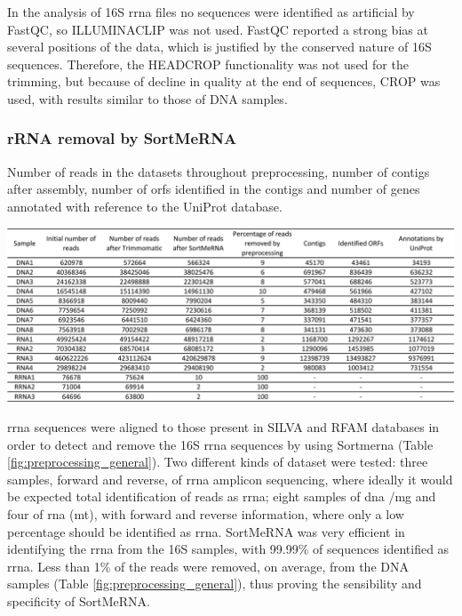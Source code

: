 \documentclass[
  oneside,
  11pt, a4paper,
  footinclude=true,
  headinclude=true,
  cleardoublepage=empty
]{scrbook}
\begin{document}
    In the analysis of 16S \gls{rrna} files no sequences were identified as artificial by FastQC, so ILLUMINACLIP was not used. FastQC reported a strong bias at several positions of the data, which is justified by the conserved nature of 16S sequences. Therefore, the HEADCROP functionality was not used for the trimming, but because of decline in quality at the end of sequences, CROP was used, with results similar to those of DNA samples.
    
    \subsubsection{rRNA removal by SortMeRNA}
    
    \begin{table}[ph!]    
    \caption{Number of reads in the datasets throughout preprocessing, number of contigs after assembly, number of \gls{orf}s identified in the contigs and number of genes annotated with reference to the UniProt database.}
    \includegraphics[width=\columnwidth]{FiguresUndTables/Results/numbers.pdf}
    \label{fig:preprocessing_general}
    \end{table}
    
    \gls{rrna} sequences were aligned to those present in SILVA and RFAM databases in order to detect and remove the 16S \gls{rrna} sequences by using Sortmerna (Table \ref{fig:preprocessing_general}). Two different kinds of dataset were tested: three samples, forward and reverse, of \gls{rrna} amplicon sequencing, where ideally it would be expected total identification of reads as \gls{rrna}; eight samples of \gls{dna} /\gls{mg} and four of \gls{rna} (\gls{mt}), with forward and reverse information, where only a low percentage should be identified as \gls{rrna}. SortMeRNA was very efficient in identifying the \gls{rrna} from the 16S samples, with 99.99\% of sequences identified as \gls{rrna}. Less than 1\% of the reads were removed, on average, from the DNA samples (Table \ref{fig:preprocessing_general}), thus proving the sensibility and specificity of SortMeRNA.
    
\end{document}

